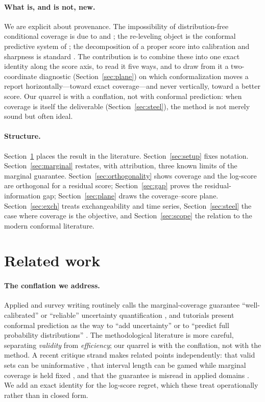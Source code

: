 \documentclass[11pt]{article}
\theoremstyle{definition}
\begin{document}
\paragraph{What is, and is not, new.}
We are explicit about provenance. The impossibility of distribution-free conditional
coverage is due to \citet{lei2014distribution} and \citet{barber2021limits}; the re-leveling
object is the conformal predictive system of \citet{vovk2019nonparametric}; the
decomposition of a proper score into calibration and sharpness is standard
\citep{gneiting2007probabilistic,gneiting2007strictly}. The contribution is to combine these
into one exact identity along the score axis, to read it five ways, and to draw from it a
two-coordinate diagnostic (Section~\ref{sec:plane}) on which conformalization moves a report
horizontally---toward exact coverage---and never vertically, toward a better score. Our
quarrel is with a conflation, not with conformal prediction: when coverage is itself the
deliverable (Section~\ref{sec:steel}), the method is not merely sound but often ideal.

\paragraph{Structure.}
Section~\ref{sec:related} places the result in the literature. Section~\ref{sec:setup}
fixes notation. Section~\ref{sec:marginal} restates, with attribution, three known limits of
the marginal guarantee. Section~\ref{sec:orthogonality} shows coverage and the log-score are
orthogonal for a residual score; Section~\ref{sec:gap} proves the residual-information gap;
Section~\ref{sec:plane} draws the coverage--score plane. Section~\ref{sec:exch} treats
exchangeability and time series, Section~\ref{sec:steel} the case where coverage is the
objective, and Section~\ref{sec:scope} the relation to the modern conformal literature.

\section{Related work}\label{sec:related}

\paragraph{The conflation we address.}
Applied and survey writing routinely calls the marginal-coverage guarantee
``well-calibrated'' or ``reliable'' uncertainty quantification
\citep{bellotti2025trustworthy}, and tutorials present conformal prediction as the way to
``add uncertainty'' \citep{tds_adduncertainty} or to ``predict full probability
distributions'' \citep{manokhin_fulldist}. The methodological literature is more careful,
separating \emph{validity} from \emph{efficiency}; our quarrel is with the conflation, not
with the method. A recent critique strand makes related points independently: that valid
sets can be uninformative \citep{recht2024cover}, that interval length can be gamed while
marginal coverage is held fixed \citep{min2026coveragelength}, and that the guarantee is
misread in applied domains \citep{pitfalls2025medical}. We add an exact identity for the
log-score regret, which these treat operationally rather than in closed form.
\end{document}
